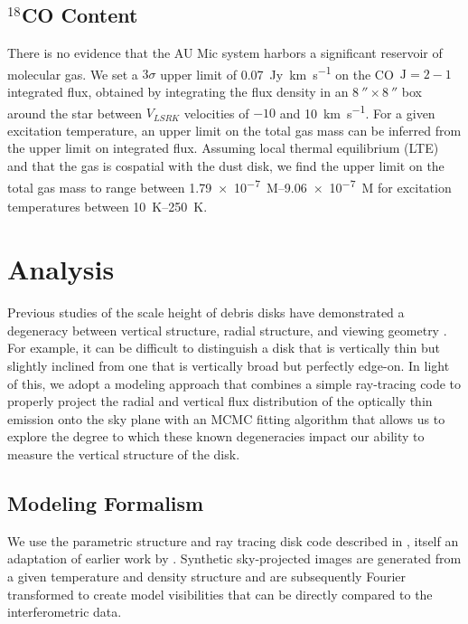 \documentclass[modern]{aastex62}
\begin{document}
\subsection{$^{18}$CO Content}
\label{subsection: gas}

There is no evidence that the AU Mic system harbors a significant reservoir of molecular gas.
We set a $3 \sigma$ upper limit of \SI{0.07}{Jy.km.s^{-1}} on the CO~$\mathrm{J}=2-1$ integrated flux, obtained by integrating the flux density in an $\SI{8}{\arcsecond} \times \SI{8}{\arcsecond}$ box around the star between $V_{LSRK}$ velocities of $-10$ and \SI{10}{km.s^{-1}}.
For a given excitation temperature, an upper limit on the total gas mass can be inferred from the upper limit on integrated flux.
Assuming local thermal equilibrium (LTE) and that the gas is cospatial with the dust disk, we find the upper limit on the total gas mass to range between \SIrange[range-phrase=\ and\ ]{1.79e-7}{9.06e-7}{M_\earth} for excitation temperatures between \SIrange[range-phrase=\ and\ ]{10}{250}{K}.



\section{Analysis}
\label{section: analysis}
Previous studies of the scale height of debris disks have demonstrated a degeneracy between vertical structure, radial structure, and viewing geometry \citep[e.g.,][]{milli14}.  
For example, it can be difficult to distinguish a disk that is vertically thin but slightly inclined from one that is vertically broad but perfectly edge-on.
In light of this, we adopt a modeling approach that combines a simple ray-tracing code to properly project the radial and vertical flux distribution of the optically thin emission onto the sky plane with an MCMC fitting algorithm that allows us to explore the degree to which these known degeneracies impact our ability to measure the vertical structure of the disk.  

\subsection{Modeling Formalism}

We use the parametric structure and ray tracing disk code described in \cite{flaherty15}, itself an adaptation of earlier work by \cite{rosenfeld13}.
Synthetic sky-projected images are generated from a given temperature and density structure and are subsequently Fourier transformed to create model visibilities that can be directly compared to the interferometric data.
\end{document}
